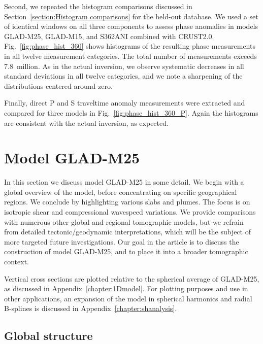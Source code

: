 Second, we repeated the histogram comparisons discussed in
Section~\ref{section:Histogram comparisons} for the held-out database.
We used a set of identical windows on all three components to assess
phase anomalies in models GLAD-M25, GLAD-M15, and S362ANI combined with CRUST2.0.
Fig.~\ref{fig:phase_hist_360} shows histograms of the resulting phase
measurements in all twelve measurement categories.
The total number of measurements exceeds 7.8~million.
As in the actual inversion,
we observe systematic decreases in all standard deviations in all twelve categories,
and we note a sharpening of the distributions centered around zero.

Finally,
direct P and S traveltime anomaly measurements were extracted and compared for three models in Fig.~\ref{fig:phase_hist_360_P}.
Again the histograms are consistent with the actual inversion,
as expected.


\section{Model GLAD-M25}
\label{section:model}

In this section we discuss model GLAD-M25 in some detail.
We begin with a global overview of the model, before concentrating on
specific geographical regions.
We conclude by highlighting various slabs and plumes.
The focus is on isotropic shear and compressional wavespeed variations.
We provide comparisons with numerous other global and regional tomographic models,
but we refrain from detailed tectonic/geodynamic interpretations,
which will be the subject of more targeted future investigations.
Our goal in the article is to discuss the construction of model GLAD-M25,
and to place it into a broader tomographic context. 

Vertical cross sections are plotted relative to the spherical average of GLAD-M25,
as discussed in Appendix~\ref{chapter:1Dmodel}.
For plotting purposes and use in other applications,
an expansion of the model in spherical harmonics and radial B-splines is
discussed in Appendix~\ref{chapter:shanalysis}.

\subsection{Global structure}

